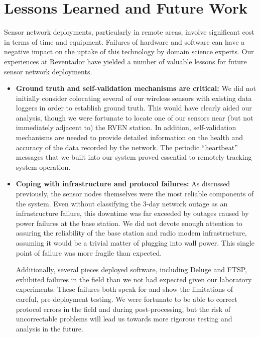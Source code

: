 \chapter{Lessons Learned and Future Work}
\label{chap-lessons}


Sensor network deployments, particularly in remote areas, involve significant
cost in terms of time and equipment. Failures of hardware and software can
have a negative impact on the uptake of this technology by domain science
experts. Our experiences at Reventador have yielded a number of valuable
lessons for future sensor network deployments. 

\begin{itemize}

\item \textbf{Ground truth and self-validation mechanisms are critical:} We did
not initially consider colocating several of our wireless sensors with
existing data loggers in order to establish ground truth. This would have
clearly aided our analysis, though we were fortunate to locate one of our
sensors near (but not immediately adjacent to) the RVEN station.  In
addition, self-validation mechanisms are needed to provide detailed
information on the health and accuracy of the data recorded by the network.
The periodic ``heartbeat'' messages that we built into our system proved
essential to remotely tracking system operation.

\item \textbf{Coping with infrastructure and protocol failures:} As discussed
previously, the sensor nodes themselves were the most reliable components of
the system. Even without classifying the 3-day network outage as an
infrastructure failure, this downtime was far exceeded by outages caused by
power failures at the base station.  We did not devote enough attention to
assuring the reliability of the base station and radio modem infrastructure,
assuming it would be a trivial matter of plugging into wall power. This
single point of failure was more fragile than expected.

Additionally, several pieces deployed software, including Deluge and FTSP,
exhibited failures in the field than we not had expected given our laboratory
experiments.  These failures both speak for and show the limitations of
careful, pre-deployment testing.  We were fortunate to be able to correct
protocol errors in the field and during post-processing, but the risk of
uncorrectable problems will lead us towards more rigorous testing and
analysis in the future.


\end{itemize}
